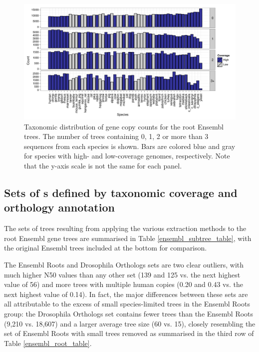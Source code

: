 \begin{landscape}
\begin{figure}[ht]
\centering
\includegraphics[scale=0.9]{Figs/ortholog_root_dups.pdf}
\caption{Taxonomic distribution of gene copy counts for the root
  Ensembl trees. The number of trees containing 0, 1, 2 or more than 3
  sequences from each species is shown. Bars are colored blue and gray
  for species with high- and low-coverage genomes, respectively. Note
  that the y-axis scale is not the same for each panel.}
\label{ortholog_root_dups}
\end{figure}
\end{landscape}

\subsection{Sets of \subtr{}s defined by taxonomic coverage and orthology annotation}

The sets of trees resulting from applying the various \subtr
extraction methods to the root Ensembl gene trees are summarised in
Table \ref{ensembl_subtree_table}, with the original Ensembl trees
included at the bottom for comparison.

The Ensembl Roots and Drosophila Orthologs sets are two clear
outliers, with much higher N50 values than any other set (139 and 125
vs. the next highest value of 56) and more trees with multiple human
copies (0.20 and 0.43 vs. the next highest value of 0.14). In fact,
the major differences between these sets are all attributable to the
excess of small species-limited trees in the Ensembl Roots group: the
Drosophila Orthologs set contains fewer trees than the Ensembl Roots
(9,210 vs. 18,607) and a larger average tree size (60 vs. 15), closely
resembling the set of Ensembl Roots with small trees removed as
summarised in the third row of Table \ref{ensembl_root_table}.


